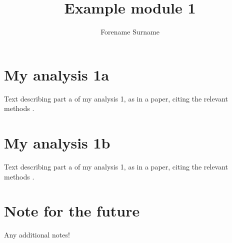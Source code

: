 \documentclass{article}
\begin{document}
\title{Example module 1}
\author{Forename Surname}

\maketitle

\section{My analysis 1a}

Text describing part a of my analysis 1, as in a paper, citing the relevant methods \citep{article_1,article_2}. 

\section{My analysis 1b}

Text describing part a of my analysis 1, as in a paper, citing the relevant methods \citep{article_3}. 

\section{Note for the future}

Any additional notes!



\end{document}
